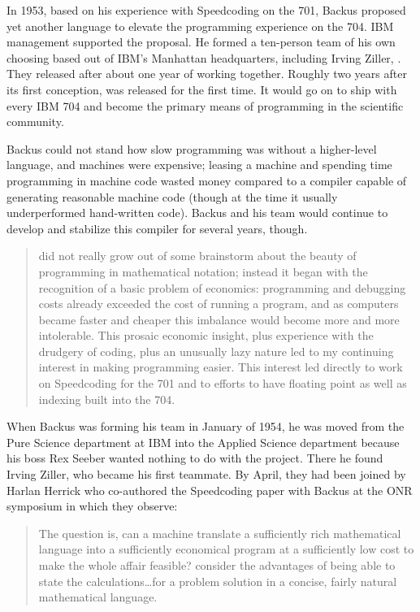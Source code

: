 In 1953, based on his experience with Speedcoding on the 701, Backus proposed
yet another language to elevate the programming experience on the 704. IBM
management supported the proposal. He formed a ten-person team of his own
choosing based out of IBM's Manhattan headquarters, including Irving Ziller,
. They released 
after about one year of working
together.
Roughly two years after its first conception, \FTN{} was released for
the first time. It would go on to ship with every IBM 704 and become the
primary means of programming in the scientific community.

Backus could not
stand how slow programming was without a higher-level language, and machines
were expensive; leasing a machine and spending time programming in machine code
wasted money compared to a compiler capable of generating reasonable machine
code (though at the time it usually underperformed hand-written code). Backus
and his team would continue to develop and stabilize this compiler for several
years, though.

\begin{quotation}
	\FTN{} did not really grow out of some brainstorm about the beauty of
	programming in mathematical notation; instead it began with the recognition
	of a basic problem of economics: programming and debugging costs already
	exceeded the cost of running a program, and as computers became faster
	and cheaper this imbalance would become more and more intolerable. This
	prosaic economic insight, plus experience with the drudgery of coding, plus
	an unusually lazy nature led to my continuing interest in making
	programming easier.
	This interest led directly to work on Speedcoding for the 701
	and to efforts to have floating point as well as indexing built into the 704.
	\cite{Backus_1980_Programming_in_America_in_1950s}
\end{quotation}

When Backus was forming his team in January of 1954, he was moved from the Pure
Science department at IBM into the Applied Science department because his boss
Rex Seeber wanted nothing to do with the project. There he found Irving Ziller,
who became his first teammate. By April, they had been joined by Harlan Herrick
who co-authored the Speedcoding paper with Backus at the ONR symposium
 in which they observe:

\begin{quotation}
	The question is, can a machine translate a sufficiently rich mathematical
	language into a sufficiently economical program at a sufficiently low cost to
	make the whole affair feasible?  consider the advantages of being
	able to state
	the calculations\dots for a problem solution in a concise, fairly natural
	mathematical language.
\end{quotation}


